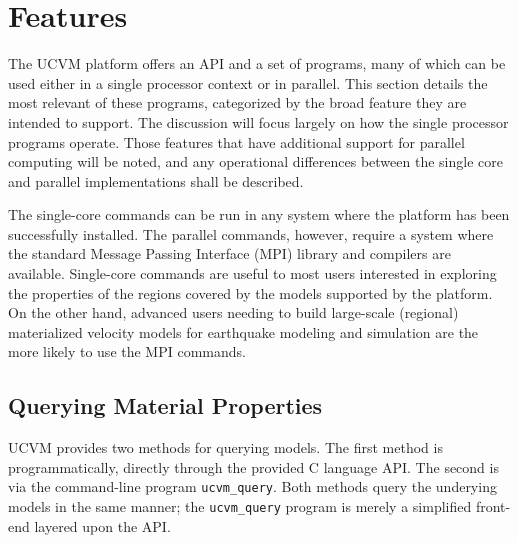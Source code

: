 \section{Features}

The UCVM platform offers an API and a set of programs, many of which can be used either in a single processor context or in parallel. This section details the most relevant of these programs, categorized by the broad feature they are intended to support. The discussion will focus largely on how the single processor programs operate. Those features that have additional support for parallel computing will be noted, and any operational differences between the single core and parallel implementations shall be described.

The single-core commands can be run in any system where the platform has been successfully installed. The parallel commands, however, require a system where the standard Message Passing Interface (MPI) library and compilers are available. Single-core commands are useful to most users interested in exploring the properties of the regions covered by the models supported by the platform. On the other hand, advanced users needing to build large-scale (regional) materialized velocity models for earthquake modeling and simulation are the more likely to use the MPI commands. 




\subsection{Querying Material Properties}

UCVM provides two methods for querying models. The first method is programmatically, directly through the provided C language API. The second is via the command-line program \texttt{ucvm\_query}. Both methods query the underying models in the same manner; the \texttt{ucvm\_query} program is merely a simplified front-end layered upon the API.

